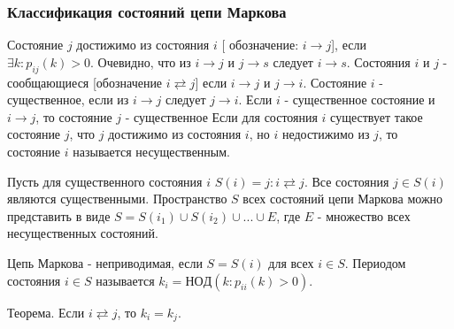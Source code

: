 \subsubsection*{Классификация состояний цепи Маркова}

Состояние $j$ достижимо из состояния $i$ [ обозначение: $i \to j$], если $\exists k: p_{ij}(k)>0$.
Очевидно, что из $i \to j$ и $j \to s$ следует $i \to s$.
Состояния $i$ и $j$ - сообщающиеся [обозначение $i \rightleftarrows j$] если $i \to j$ и $j \to i$.
Состояние $i$ - существенное, если из $i \to j$ следует $j \to i$.
Если $i$ - существенное состояние и $i \to j$, то состояние $j$ - существенное
Если для состояния $i$ существует такое состояние $j$, что $j$ достижимо из состояния $i$, но $i$ недостижимо из $j$, то состояние $i$ называется несущественным.

Пусть для существенного состояния $i$ $S(i)={j:i \rightleftarrows j}$. Все состояния $j\in S(i)$ являются существенными. Пространство $S$ всех состояний цепи Маркова можно представить в виде $S=S(i_1)\cup S(i_2)\cup ...\cup E$, где $E$ - множество всех несущественных состояний.

Цепь Маркова - неприводимая, если $S=S(i)$ для всех $i\in S$. Периодом состояния $i\in S$ называется $k_i=НОД(k: p_{ii}(k)>0)$.

Теорема. Если $i \rightleftarrows j$, то $k_i=k_j$.